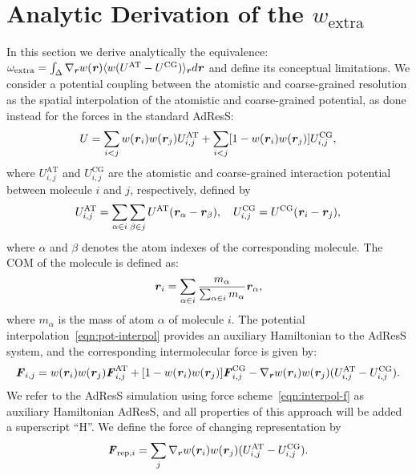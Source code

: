\documentclass[a4paper,preprint,unsortedaddress]{revtex4-1}
\newcommand{\recheck}[1]{{\color{red} #1}}
\newcommand{\vect}[1]{\textbf{\textit{#1}}}
\newcommand{\AT}{{\textrm{{AT}}}}
\newcommand{\CG}{{\textrm{CG}}}
\newcommand{\res}{{\textrm{rep}}}
\newcommand{\ext}{{\textrm{extra}}}
\begin{document}
\section{Analytic Derivation of the $w_{\ext}$}\label{sec:tmp4}
\recheck{In this section we derive analytically the equivalence:
  $\omega_{\ext}=\int_{\Delta}\nabla_{\vect r} w(\vect r) \langle w(U^{\AT}-U^{\CG})\rangle_{\vect r} d{\vect r}$ and define its conceptual limitations.
We consider a potential coupling between the atomistic and coarse-grained resolution as the spatial interpolation of the atomistic and coarse-grained potential, as done instead for the forces in the standard AdResS:
\begin{align}
  U =
  \sum_{i<j} w(\vect r_i) w(\vect r_j)
  U^\AT_{i,j}
  +
  \sum_{i<j}[1- w(\vect r_i) w(\vect r_j)]
  U^\CG_{i,j},
\end{align}
where $U^\AT_{i,j}$ and $U^\CG_{i,j}$ are the atomistic and coarse-grained interaction potential between molecule $i$ and $j$, respectively, defined by
\begin{align}\label{eqn:pot-interpol}
  U^\AT_{i,j} =
  \sum_{\alpha\in i}\sum_{\beta\in j} U^\AT(\vect r_\alpha - \vect r_\beta),\quad
  U^\CG_{i,j} =
  U^\CG(\vect r_i - \vect r_j),
\end{align}
where  $\alpha$ and $\beta$ denotes the atom indexes of the corresponding molecule.
The COM of the molecule is defined as:
\begin{align}
  \vect r_i = \sum_{\alpha\in i} \frac{m_\alpha}{\sum_{\alpha\in i} m_\alpha} \vect r_\alpha,
\end{align}
where $m_\alpha$ is the mass of atom $\alpha$ of molecule $i$.
\recheck{The potential interpolation~\eqref{eqn:pot-interpol} provides an auxiliary Hamiltonian to the AdResS system, and
the
corresponding intermolecular force is given by:}
\begin{align}\label{eqn:interpol-f}
  \vect F_{i,j} =
  w(\vect r_i) w(\vect r_j)
  \vect F^\AT_{i,j}
  +
  [1- w(\vect r_i) w(\vect r_j)]
  \vect F_{i,j}^\CG
  -
  \nabla_{\vect r} w(\vect r_i) w(\vect r_j)
  (U^\AT_{i,j} - U^\CG_{i,j}).
\end{align}
\recheck{We refer to the AdResS simulation using force scheme~\eqref{eqn:interpol-f} as
  auxiliary Hamiltonian AdResS, and all properties of this approach will be added a superscript ``H''}.
We define the force of changing representation by
\begin{align}\label{eqn:frep}
  \vect F_{\res,i} = 
  \sum_j \nabla_{\vect r} w(\vect r_i) w(\vect r_j)
  (U^\AT_{i,j} - U^\CG_{i,j}).
\end{align}


}
\end{document}
